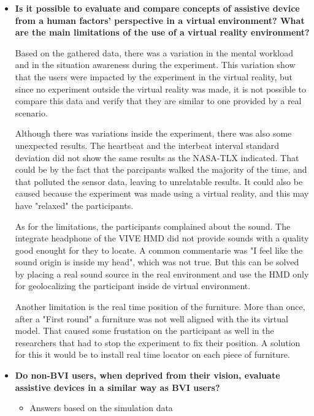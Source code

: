 \begin{itemize}
    \item \textbf{Is it possible to evaluate and compare concepts of assistive device from a human factors’ perspective in a virtual environment? What are the main limitations of the use of a virtual reality environment?}

    Based on the gathered data, there was a variation in the mental workload and in the situation awareness during the experiment. This variation show that the users were impacted by the experiment in the virtual reality, but since no experiment outside the virtual reality was made, it is not possible to compare this data and verify that they are similar to one provided by a real scenario.

    Although there was variations inside the experiment, there was also some unexpected results. The heartbeat and the interbeat interval standard deviation did not show the same results as the NASA-TLX indicated. That could be by the fact that the parcipants walked the majority of the time, and that polluted the sensor data, leaving to unrelatable results. It could also be caused because the experiment was made using a virtual reality, and this may have "relaxed" the participants.

    As for the limitations, the participants complained about the sound. The integrate headphone of the VIVE HMD did not provide sounds with a quality good enought for they to locate. A common commentarie was "I feel like the sound origin is inside my head", which was not true. But this can be solved by placing a real sound source in the real environment and use the HMD only for geolocalizing the participant inside de virtual environment.

    Another limitation is the real time position of the furniture. More than once, after a "First round" a furniture was not well aligned with the its virtual model. That caused some frustation on the participant as well in the researchers that had to stop the experiment to fix their position. A solution for this it would be to install real time locator on each piece of furniture.

    \item \textbf{Do non-BVI users, when deprived from their vision, evaluate assistive devices in a similar way as BVI users?}

    \begin{itemize}
        \item Answers based on the simulation data


\end{itemize}
\end{itemize}
